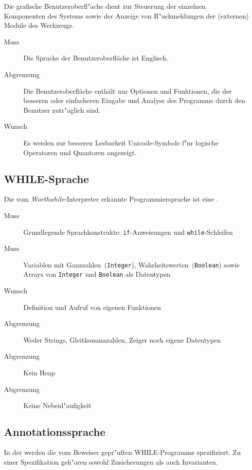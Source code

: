 Die grafische Benutzeroberfl"ache dient zur Steuerung der einzelnen Komponenten des Systems sowie der Anzeige von R"uckmeldungen der (externen) Module des Werkzeugs.%

\begin{description}%
    \item [Muss] Die Sprache der Benutzeroberfläche ist Englisch.%
    \item [Abgrenzung] Die Benutzeroberfläche enthält nur Optionen und Funktionen, die der besseren oder einfacheren Eingabe und Analyse des Programms durch den Benutzer zutr"aglich sind.%
    \item [Wunsch] Es werden zur besseren Lesbarkeit Unicode-Symbole f"ur logische Operatoren und Quantoren angezeigt.%
\end{description}%

\subsection{WHILE-Sprache}%

Die vom \textit{Worthwhile}-Interpreter erkannte Programmiersprache ist eine .

\begin{description}%
    \item [Muss] Grundlegende Sprachkonstrukte: \texttt{if}-Anweisungen und \texttt{while}-Schleifen
    \item [Muss] Variablen mit Ganzzahlen~(\texttt{Integer}), Wahrheitswerten~(\texttt{Boolean}) sowie Arrays von \texttt{Integer} und \texttt{Boolean} als Datentypen%
    \item [Wunsch] Definition und Aufruf von eigenen Funktionen%
    \item [Abgrenzung] Weder Strings, Gleitkommazahlen, Zeiger noch eigene Datentypen%
    \item [Abgrenzung] Kein Heap%
    \item [Abgrenzung] Keine Nebenl"aufigkeit%
\end{description}%

\subsection{Annotationssprache}%

In der  werden die vom Beweiser gepr"uften WHILE-Programme spezifiziert. Zu einer Spezifikation geh"oren sowohl Zusicherungen als auch Invarianten.%

